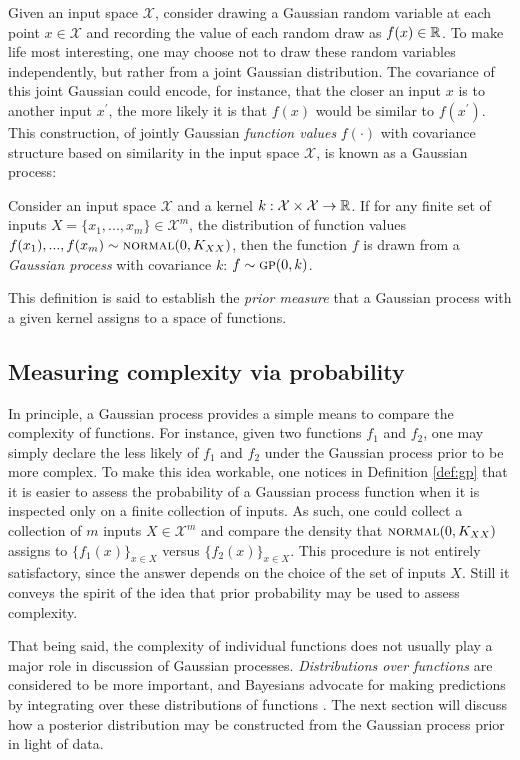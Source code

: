 \begin{refsection}
Given an input space $\mathcal{X}$, consider drawing a Gaussian random variable at each point $x\in\mathcal{X}$ and recording the value of each random draw as $f(x)\in\mathbb{R}$. To make life most interesting, one may choose not to draw these random variables independently, but rather from a joint Gaussian distribution. The covariance of this joint Gaussian could encode, for instance, that the closer an input $x$ is to another input $x^\prime$, the more likely it is that $f(x)$ would be similar to $f(x^\prime)$. This construction, of jointly Gaussian \textit{function values} $f(\cdot)$ with covariance structure based on similarity in the input space $\mathcal{X}$, is known as a Gaussian process:
\begin{definition}\label{def:gp} Consider an input space $\mathcal{X}$ and a kernel $k:\mathcal{X}\times\mathcal{X}\to\mathbb{R}$. If for any finite set of inputs $X=\{x_1, ..., x_m\}\in\mathcal{X}^m$, the distribution of function values $f(x_1),...,f(x_m) \sim \textsc{normal}(0, K_{XX})$, then the function $f$ is drawn from a \textit{Gaussian process} with covariance $k$: $f\sim\textsc{gp}(0,k)$.
\end{definition}
This definition is said to establish the \textit{prior measure} that a Gaussian process with a given kernel assigns to a space of functions.

\subsection{Measuring complexity via probability}
In principle, a Gaussian process provides a simple means to compare the complexity of functions. For instance, given two functions $f_1$ and $f_2$, one may simply declare the less likely of $f_1$ and $f_2$ under the Gaussian process prior to be more complex. To make this idea workable, one notices in Definition \ref{def:gp} that it is easier to assess the probability of a Gaussian process function when it is inspected only on a finite collection of inputs. As such, one could collect a collection of $m$ inputs $X\in\mathcal{X}^m$ and compare the density that $\textsc{normal}(0,K_{XX})$ assigns to $\{f_1(x)\}_{x\in X}$ versus $\{f_2(x)\}_{x\in X}$. This procedure is not entirely satisfactory, since the answer depends on the choice of the set of inputs $X$. Still it conveys the spirit of the idea that prior probability may be used to assess complexity.

That being said, the complexity of individual functions does not usually play a major role in discussion of Gaussian processes. \textit{Distributions over functions} are considered to be more important, and Bayesians advocate for making predictions by integrating over these distributions of functions \citep{radford}. The next section will discuss how a posterior distribution may be constructed from the Gaussian process prior in light of data.


\end{refsection}
